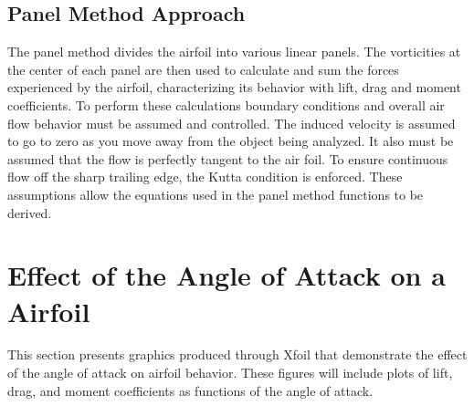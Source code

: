 \documentclass{article}
\begin{document}
\subsection{Panel Method Approach}
The panel method divides the airfoil into various linear panels. The vorticities at the center of each panel are then used to calculate and sum the forces experienced by the airfoil, characterizing its behavior with lift, drag and moment coefficients. To perform these calculations boundary conditions and overall air flow behavior must be assumed and controlled. The induced velocity is assumed to go to zero as you move away from the object being analyzed. It also must be assumed that the flow is perfectly tangent to the air foil. To ensure continuous flow off the sharp trailing edge, the Kutta condition is enforced. These assumptions allow the equations used in the panel method functions to be derived.

\section{Effect of the Angle of Attack on a Airfoil}
This section presents graphics produced through Xfoil that demonstrate the effect of the angle of attack on airfoil behavior. These figures will include plots of lift, drag, and moment coefficients as functions of the angle of attack.
\end{document}
